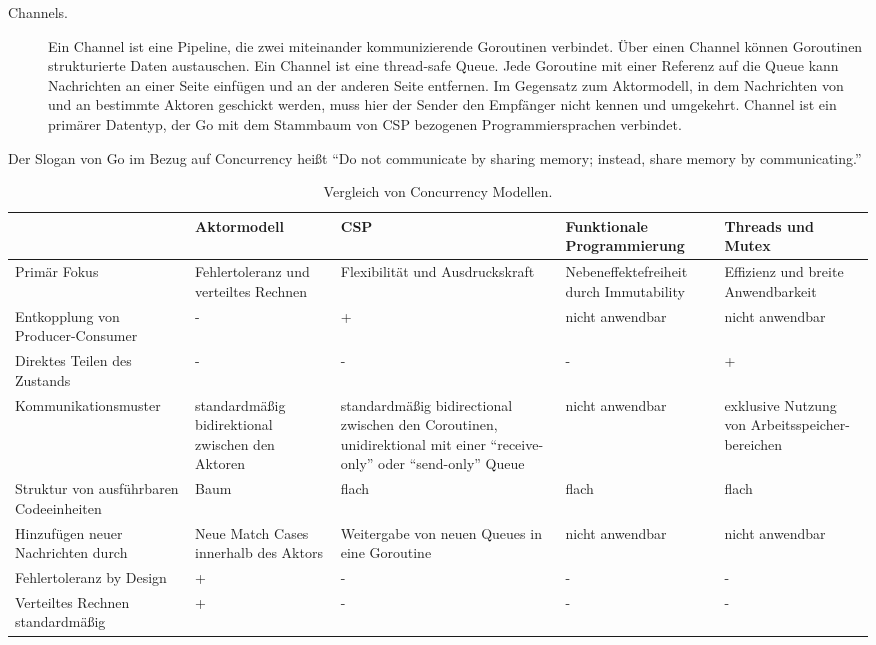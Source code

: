 \begin{description}
\begin{description}
		\item[Channels.] Ein Channel ist eine Pipeline, die zwei miteinander kommunizierende Goroutinen verbindet. Über einen Channel können Goroutinen strukturierte Daten austauschen. Ein Channel ist eine thread-safe Queue. Jede Goroutine mit einer Referenz auf die Queue kann Nachrichten an einer Seite einfügen und an der anderen Seite entfernen. Im Gegensatz zum Aktormodell, in dem Nachrichten von und an bestimmte Aktoren geschickt werden, muss hier der Sender den Empfänger nicht kennen und umgekehrt. Channel ist ein primärer Datentyp, der Go mit dem Stammbaum von CSP bezogenen Programmiersprachen verbindet.
	\end{description}

	Der Slogan von Go im Bezug auf Concurrency heißt “Do not communicate by sharing memory; instead, share memory by communicating.”
	
\end{description}

\begin{table} \centering
	\begin{tabular}{|P{3cm}|P{3cm}|P{3cm}|P{3cm}|P{3cm}|} 
		\hline
		&  \textbf{Aktormodell} & \textbf{CSP} & \textbf{Funktionale Programmierung} & \textbf{Threads und Mutex}\\
		
		\hline
		Primär Fokus & Fehlertoleranz und verteiltes Rechnen & Flexibilität und Ausdruckskraft & Nebeneffektefreiheit durch Immutability & Effizienz und breite Anwendbarkeit\\
		
		\hline
		Entkopplung von Producer-Consumer & - & + & nicht anwendbar & nicht anwendbar\\

		\hline
		Direktes Teilen des Zustands & - & - & - & +\\
		
		\hline
		Kommunikationsmuster & standardmäßig bidirektional zwischen den Aktoren & standardmäßig bidirectional zwischen den Coroutinen, unidirektional mit einer “receive-only” oder “send-only” Queue & nicht anwendbar & exklusive Nutzung von Arbeitsspeicher-bereichen\\
		
		\hline
		Struktur von ausführbaren Codeeinheiten & Baum & flach & flach & flach\\
		
		\hline
		Hinzufügen neuer Nachrichten durch & Neue Match Cases innerhalb des Aktors & Weitergabe von neuen Queues in eine Goroutine & nicht anwendbar & nicht anwendbar\\

		\hline
		Fehlertoleranz by Design & + & - & - & -\\
		
		\hline
		Verteiltes Rechnen standardmäßig & + & - & - & -\\
		
		\hline
	\end{tabular}
	\caption{Vergleich von Concurrency Modellen.}
	\label{tab:vergleichConcurrencyModelle}
\end{table}

